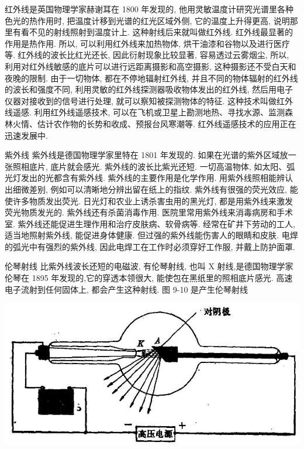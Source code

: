 \documentclass[10pt]{article}
\begin{document}
红外线是英国物理学家赫谢耳在 1800 年发现的, 他用灵敏温度计研究光谱里各种色光的热作用时, 把温度计移到光谱的红光区域外侧, 它的温度上升得更高, 说明那里有看不见的射线照射到温度计上. 这种射线后来就叫做红外线. 红外线最显著的作用是热作用. 所以, 可以利用红外线来加热物体, 烘干油漆和谷物以及进行医疗等. 红外线的波长比红光还长, 因此衍射现象比较显著, 容易透过云雾烟尘, 所以, 利用对红外线敏感的底片可以进行远距离摄影和高空摄影, 这种摄影还不受白天和夜晚的限制. 由于一切物体, 都在不停地辐射红外线, 并且不同的物体辐射的红外线的波长和强度不同, 利用灵敏的红外线探测器吸收物体发出的红外线, 然后用电子仪器对接收到的信号进行处理, 就可以察知被探测物体的特征. 这种技术叫做红外线遥感. 利用红外线遥感技术, 可以在飞机或卫星上勘测地热、寻找水源、监测森林火情、估计农作物的长势和收成、预报台风寒潮等. 红外线遥感技术的应用正在迅速发展中.

紫外线 紫外线是德国物理学家里特在 1801 年发现的. 如果在光谱的紫外区域放一张照相底片, 底片就会感光. 紫外线的波长比紫光还短. 一切高温物体, 如太阳、弧光灯发出的光都含有紫外线. 紫外线的主要作用是化学作用. 用紫外线照相能辨认出细微差别, 例如可以清晰地分辨出留在纸上的指纹. 紫外线有很强的荧光效应, 能使许多物质发出荧光. 日光灯和农业上诱杀害虫用的黑光灯, 都是用紫外线来激发荧光物质发光的. 紫外线还有杀菌消毒作用. 医院里常用紫外线来消毒病房和手术室. 紫外线还能促进生理作用和治疗皮肤病、软骨病等. 经常在矿井下劳动的工人, 适当地照射紫外线, 能促进身体健康. 但过强的紫外线能伤害人的眼睛和皮肤. 电焊的弧光中有强烈的紫外线, 因此电焊工在工作时必须穿好工作服, 并戴上防护面罩.

伦琴射线 比紫外线波长还短的电磁波, 有伦琴射线, 也叫 \(\mathrm{X}\) 射线,是德国物理学家伦琴在 1895 年发现的,它的穿透本领很大, 能使包在黑纸里的照相底片感光. 高速电子流射到任何固体上, 都会产生这种射线. 图 9-10 是产生伦琴射线

\begin{center}
\includegraphics[max width=1.0\textwidth]{images/01913056-1f15-74d8-9184-9aab52c9d66b_311_505993.jpg}
\end{center}
\end{document}
